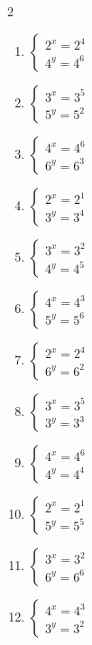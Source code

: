 \documentclass[12pt,a4paper]{article}
\begin{document}
\begin{multicols}{2}
\begin{enumerate}[leftmargin=*, itemsep=6pt]
\item \(\begin{cases} 2^x=2^{4}\\ 4^y=4^{6}\end{cases}\)

\item \(\begin{cases} 3^x=3^{5}\\ 5^y=5^{2}\end{cases}\)

\item \(\begin{cases} 4^x=4^{6}\\ 6^y=6^{3}\end{cases}\)

\item \(\begin{cases} 2^x=2^{1}\\ 3^y=3^{4}\end{cases}\)

\item \(\begin{cases} 3^x=3^{2}\\ 4^y=4^{5}\end{cases}\)

\item \(\begin{cases} 4^x=4^{3}\\ 5^y=5^{6}\end{cases}\)

\item \(\begin{cases} 2^x=2^{4}\\ 6^y=6^{2}\end{cases}\)

\item \(\begin{cases} 3^x=3^{5}\\ 3^y=3^{3}\end{cases}\)

\item \(\begin{cases} 4^x=4^{6}\\ 4^y=4^{4}\end{cases}\)

\item \(\begin{cases} 2^x=2^{1}\\ 5^y=5^{5}\end{cases}\)

\item \(\begin{cases} 3^x=3^{2}\\ 6^y=6^{6}\end{cases}\)

\item \(\begin{cases} 4^x=4^{3}\\ 3^y=3^{2}\end{cases}\)

\end{enumerate}
\end{multicols}
\newpage
\end{document}
